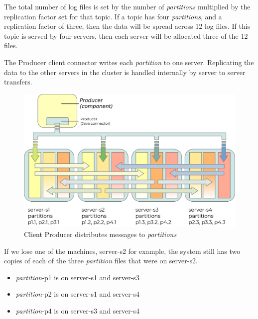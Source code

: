 \documentclass{article}
\newcommand{\kfpartition} {\textit{partition}\xspace}
\newcommand{\kfpartitions} {\textit{partitions}\xspace}
\newcommand{\javaname}[1] {{\ttfamily\color{codeblue} #1}}
\begin{document}
%

The total number of log files is set by the number of \kfpartitions multiplied by the replication factor set for that topic.
If a topic has four \kfpartitions, and a replication factor of three, then the data will be spread across 12 log files.
If this topic is served by four servers, then each server will be allocated three of the 12 files.

The \javaname{Producer} client connector writes each \kfpartition to one server. Replicating the data to the other servers in the cluster is handled internally by server to server transfers.

\begin{figure}[H]
\centering
\includegraphics{images/kafka-partitions-03.png}
%
\caption{Client \javaname{Producer} distributes messages to \kfpartitions}
\label{fig:kafka-partitions-03}
\end{figure}

If we lose one of the machines, server-s2 for example, the system still has two copies of each of the three \kfpartition files that were on server-s2.

\begin{itemize}
    \item \kfpartition-p1 is on server-s1 and server-s3
    \item \kfpartition-p2 is on server-s1 and server-s4
    \item \kfpartition-p4 is on server-s3 and server-s4
\end{itemize}
\end{document}

